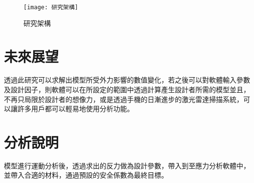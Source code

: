 \begin{figure}[hbt!]
\begin{center}
\texttt{[image: 研究架構]}
\caption{\Large 研究架構 }
\label{研究架構 }
\end{center}
\end{figure}


\section{未來展望}

透過此研究可以求解出模型所受外力影響的數值變化，若之後可以對軟體輸入參數及設計因子，則軟體可以在所設定的範圍中透過計算產生設計者所需的模型並且，不再只局限於設計者的想像力，或是透過手機的日漸進步的激光雷達掃描系統，可以讓許多用戶都可以輕易地使用分析功能。\\

\section{分析說明}

模型進行運動分析後，透過求出的反力做為設計參數，帶入到至應力分析軟體中，並帶入合適的材料，通過預設的安全係數為最終目標。\\

\renewcommand{\baselinestretch}{0.5} %
